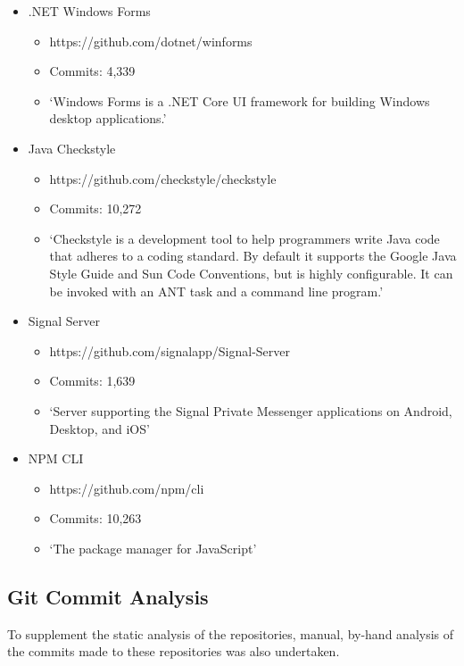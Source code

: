 \documentclass{article}
\begin{document}
            \begin{itemize}
                \item .NET Windows Forms
                \begin{itemize}
                    \item https://github.com/dotnet/winforms
                    \item Commits: 4,339
                    \item `Windows Forms is a .NET Core UI framework for building Windows desktop applications.'
                \end{itemize}
                \item Java Checkstyle
                \begin{itemize}
                    \item https://github.com/checkstyle/checkstyle
                    \item Commits: 10,272
                    \item `Checkstyle is a development tool to help programmers write Java code that adheres to a coding standard. By default it supports the Google Java Style Guide and Sun Code Conventions, but is highly configurable. It can be invoked with an ANT task and a command line program.'
                \end{itemize}
                \item Signal Server
                \begin{itemize}
                    \item https://github.com/signalapp/Signal-Server
                    \item Commits: 1,639
                    \item `Server supporting the Signal Private Messenger applications on Android, Desktop, and iOS'
                \end{itemize}
                \item NPM CLI
                \begin{itemize}
                    \item https://github.com/npm/cli
                    \item Commits: 10,263
                    \item `The package manager for JavaScript'
                \end{itemize}
            \end{itemize}

    \subsection{Git Commit Analysis}
        To supplement the static analysis of the repositories, manual, by-hand analysis of the commits made to these repositories was also undertaken.
\end{document}
